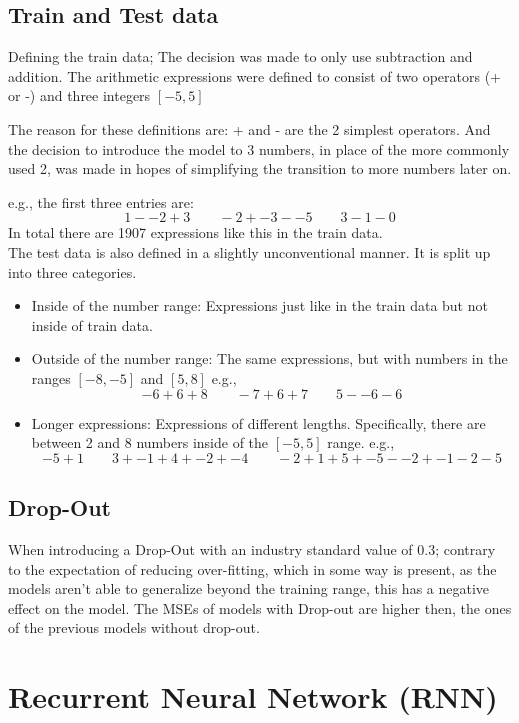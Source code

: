 \documentclass{article}
\begin{document}
\subsection{Train and Test data}
Defining the train data; The decision was made to only use subtraction and 
addition. The arithmetic expressions were defined to consist of two 
operators (+ or -) and three integers $[-5, 5]$

The reason for these definitions are: + and - are the 2 simplest operators. 
And the decision to introduce the model to 3 numbers, in place of the more 
commonly used 2, was made in hopes of simplifying the transition to more 
numbers later on.

e.g., the first three entries are: 
\[
1 - -2 + 3 \qquad -2 + -3 - -5 \qquad 3 - 1 - 0
\]
{\small In total there are 1907 expressions like this in the train data.}
\\[2em]
The test data is also defined in a slightly unconventional manner. It is 
split up into three categories.
\begin{itemize}
    \item Inside of the number range: Expressions just like in the train 
data but not inside of train data. 
    \item Outside of the number range: The same expressions, but with 
numbers in the ranges $[-8, -5]$ and $[5, 8]$ e.g.,
\[
-6 + 6 + 8 \qquad -7 + 6 + 7 \qquad 5 - -6 - 6
\]
    \item Longer expressions: Expressions of different lengths. 
Specifically, there are between 2 and 8 numbers inside of the $[-5, 5]$ 
range. e.g.,
\[
-5 + 1 \qquad 3 + -1 + 4 + -2 + -4 \qquad -2 + 1 + 5 + -5 - -2 + -1 - 2 - 5
\]
\end{itemize}

\subsection{Drop-Out}
When introducing a Drop-Out with an industry standard value of 0.3; contrary 
to the expectation of reducing over-fitting, which in some way is present, 
as the models aren't able to generalize beyond the training range, this has 
a negative effect on the model. The MSEs of models with Drop-out are higher 
then, the ones of the previous models without drop-out.

\section{Recurrent Neural Network (RNN)}
\end{document}
